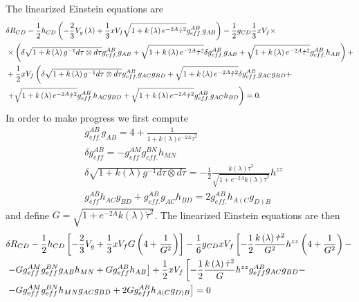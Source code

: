 \documentclass[a4paper,12pt]{article}
\begin{document}
The linearized Einstein equations are
\begin{align}
& \delta R_{CD} - \frac{1}{2} h_{CD} \left( - \frac{2}{3} V_g \left(\lambda\right) + \frac{1}{3} x V_f \sqrt{1 + k\left(\lambda\right) e^{-2A} \dot{\tau}^2} g_{eff.}^{AB} g_{AB} \right) - \frac{1}{2} g_{CD} \frac{1}{3} x V_f \times \notag \\
& \times \left( \delta  \sqrt{1 + k\left(\lambda\right) g^{-1} d \tau \otimes d \tau} g_{eff.}^{AB}g_{AB} +  \sqrt{1 + k\left(\lambda\right) e^{-2A} \dot{\tau}^2} \delta g_{eff.}^{AB} g_{AB} +  \sqrt{1 + k\left(\lambda\right) e^{-2A} \dot{\tau}^2} g^{AB}_{eff.} h_{AB} \right) + \notag \\
& + \frac{1}{2} x V_f \left(  \delta  \sqrt{1 + k\left(\lambda\right) g^{-1} d \tau \otimes d \tau} g_{eff.}^{AB} g_{AC} g_{BD} +  \sqrt{1 + k\left(\lambda\right) e^{-2A} \dot{\tau}^2} \delta g_{eff.}^{AB} g_{AC} g_{BD} + \right. \notag \\
&\left. +  \sqrt{1 + k\left(\lambda\right) e^{-2A} \dot{\tau}^2} g_{eff.}^{AB} h_{AC} g_{BD} +  \sqrt{1 + k\left(\lambda\right) e^{-2A} \dot{\tau}^2} g_{eff.}^{AB} g_{AC} h_{BD}\right) = 0.
\end{align}
In order to make progress we first compute
\begin{align}
&g_{eff.}^{AB} g_{AB} = 4 + \frac{1}{1 + k\left( \lambda \right) e^{-2A} {\dot{\tau}}^2} \\
& \delta g_{eff}^{AB} = - g_{eff}^{AM} g_{eff.}^{BN} h_{MN} \\
& \delta  \sqrt{1 + k\left(\lambda\right) g^{-1} d \tau \otimes d \tau} = - \frac{1}{2} \frac{k\left( \lambda \right) {\dot{\tau}}^2}{\sqrt{1+e^{-2A} k\left(\lambda\right) {\dot{\tau}}^2}} h^{zz} \\
& g_{eff}^{AB}h_{AC}g_{BD} + g_{eff.}^{AB} g_{AC} h_{BD} = 2 g_{eff.}^{AB} h_{A\left(C\right.}g_{\left.D\right)B}
\end{align}
and define $G = \sqrt{1+e^{-2A} k\left(\lambda\right) {\dot{\tau}}^2}$. The linearized Einstein equations are then
\begin{align}
&\delta R_{CD} - \frac{1}{2} h_{CD} \left[ -\frac{2}{3} V_g + \frac{1}{3} x V_f G \left(4 + \frac{1}{G^2} \right)\right] - \frac{1}{6} g_{CD} x V_f \left[ -\frac{1}{2} \frac{k\left(\lambda\right) {\dot{\tau}}^2}{G^2} h^{zz} \left(4 + \frac{1}{G^2}\right) - \right. \notag \\
& \left. - G g_{eff}^{AM} g_{eff}^{BN} g_{AB} h_{MN} + G g_{eff}^{AB} h_{AB}  \right]  + \frac{1}{2} x V_f \left[ - \frac{1}{2} \frac{k\left(\lambda\right) {\dot{\tau}}^2}{G} h^{zz} g_{eff}^{AB} g_{AC} g_{BD}  - \right. \notag \\
&\left. - G g_{eff}^{AM} g_{eff}^{BN} h_{MN} g_{AC} g_{BD} + 2 G g_{eff}^{AB} h_{A(C}g_{D)B} \right] = 0
\end{align}
\end{document}
